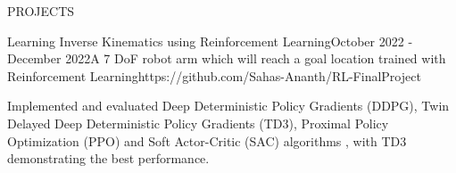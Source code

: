 \documentclass{resume} %
\begin{document}
\begin{rSection}{PROJECTS}
	\begin{rProjExpDetails}{Learning Inverse Kinematics using Reinforcement Learning}{}{October 2022 - December 2022}{A 7 DoF robot arm which will reach a goal location trained with Reinforcement Learning}{https://github.com/Sahas-Ananth/RL-FinalProject}{}
		\item Implemented and evaluated Deep Deterministic Policy Gradients (DDPG), Twin Delayed Deep Deterministic Policy Gradients (TD3), Proximal Policy Optimization (PPO) and Soft Actor-Critic (SAC) algorithms , with TD3 demonstrating the best performance.
	\end{rProjExpDetails}

\end{rSection}
\end{document}
